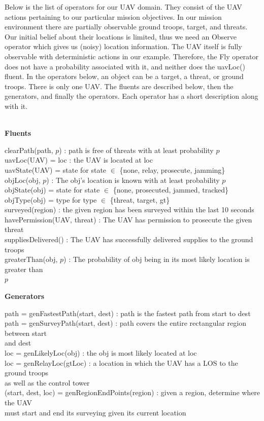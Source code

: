 \documentclass[12pt]{article}
\begin{document}
Below is the list of operators for our UAV domain. They consist of the UAV actions pertaining to our particular mission objectives. In our mission environment there are partially observable ground troops, target, and threats. Our initial belief about their locations is limited, thus we need an Observe operator which gives us (noisy) location information. The UAV itself is fully observable with deterministic actions in our example. Therefore, the Fly operator does not have a probability associated with it, and neither does the uavLoc() fluent. In the operators below, an object can be a target, a threat, or ground troops. There is only one UAV. The fluents are described below, then the generators, and finally the operators. Each operator has a short description along with it.
\\\
\begin{center}
\textbf{Fluents} 
\end{center}
clearPath(path, $p$) : path is free of threats with at least probability $p$ \\
uavLoc(UAV) = loc : the UAV is located at loc \\
uavState(UAV) = state for state $\in$ \{none, relay, prosecute, jamming\} \\
objLoc(obj, $p$) : The obj's location is known with at least probability $p$ \\
objState(obj) = state for state $\in$ \{none, prosecuted, jammed, tracked\} \\
objType(obj) = type for type $\in$ \{threat, target, gt\} \\
surveyed(region) : the given region has been surveyed within the last 10 seconds  \\
havePermission(UAV, threat) : The UAV has permission to prosecute the given threat \\
suppliesDelivered() : The UAV has successfully delivered supplies to the ground troops \\
greaterThan(obj, $p$) : The probability of obj being in its most likely location is greater than \\
\indent  $p$ \\

\begin{center}
\textbf{Generators} 
\end{center}
path = genFastestPath(start, dest) : path is the fastest path from start to dest \\
path = genSurveyPath(start, dest) : path covers the entire rectangular region between start \\
\indent and dest\\
loc = genLikelyLoc(obj) : the obj is most likely located at loc \\
loc = genRelayLoc(gtLoc) : a location in which the UAV has a LOS to the ground troops \\
\indent as well as the control tower \\
(start, dest, loc) = genRegionEndPoints(region) : given a region, determine where the UAV \\
\indent must start and end its surveying given its current location\\
\end{document}
